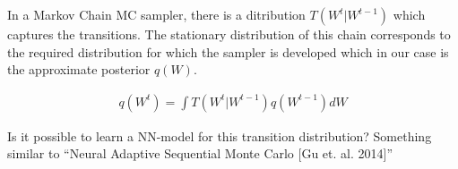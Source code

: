 \documentclass[twoside]{article}
\begin{document}
In a Markov Chain MC sampler, there is a ditribution $T(W^{t}|W^{t-1})$ which captures the transitions. The stationary distribution of this chain corresponds to the required distribution for which the sampler is developed which in our case is the approximate posterior $q(W)$. 

\begin{align}
q(W^t) = \int T(W^{t}|W^{t-1})q(W^{t-1})dW
\end{align}

Is it possible to learn a NN-model for this transition distribution? Something similar to ``Neural Adaptive Sequential Monte Carlo [Gu et. al. 2014]''



%
%
\end{document}
